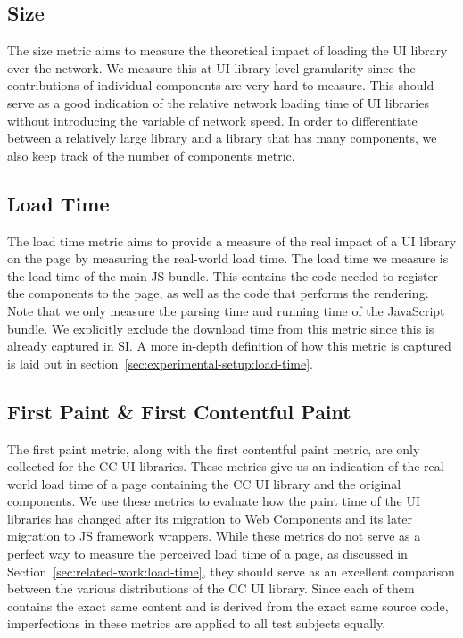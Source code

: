 \subsection{Size}
The size metric aims to measure the theoretical impact of loading the UI library over the network. We measure this at UI library level granularity since the contributions of individual components are very hard to measure. This should serve as a good indication of the relative network loading time of UI libraries without introducing the variable of network speed. In order to differentiate between a relatively large library and a library that has many components, we also keep track of the number of components metric.

\subsection{Load Time}
The load time metric aims to provide a measure of the real impact of a UI library on the page by measuring the real-world load time. The load time we measure is the load time of the main JS bundle. This contains the code needed to register the components to the page, as well as the code that performs the rendering. Note that we only measure the parsing time and running time of the JavaScript bundle. We explicitly exclude the download time from this metric since this is already captured in SI\@. A more in-depth definition of how this metric is captured is laid out in section~\ref{sec:experimental-setup:load-time}.

\subsection{First Paint \& First Contentful Paint}
The first paint metric, along with the first contentful paint metric, are only collected for the CC UI libraries. These metrics give us an indication of the real-world load time of a page containing the CC UI library and the original components. We use these metrics to evaluate how the paint time of the UI libraries has changed after its migration to Web Components and its later migration to JS framework wrappers. While these metrics do not serve as a perfect way to measure the perceived load time of a page, as discussed in Section~\ref{sec:related-work:load-time}, they should serve as an excellent comparison between the various distributions of the CC UI library. Since each of them contains the exact same content and is derived from the exact same source code, imperfections in these metrics are applied to all test subjects equally.

